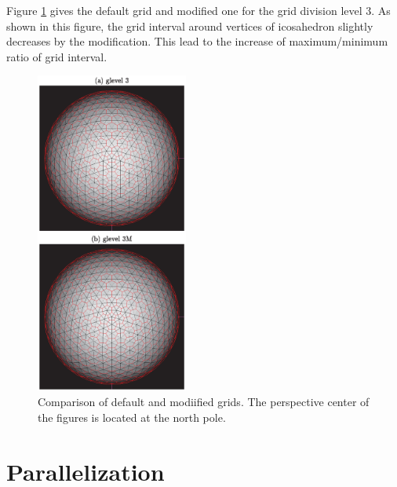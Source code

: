 Figure \ref{fig:scale-gm_control_volume_comparison} gives the default grid and modified one for the grid division level
3. As shown in this figure, the grid interval around vertices of icosahedron
slightly decreases by the modification. This lead to the increase of
maximum/minimum ratio of grid interval. 

\begin{figure}[H]
  \begin{center}
    \includegraphics[width=5cm]{figure/control_volume_comparison}
    \caption{Comparison of default and modiified grids. The perspective
      center of the figures is located at the north pole.}
    \label{fig:scale-gm_control_volume_comparison}
  \end{center}
\end{figure}



\section{Parallelization}
